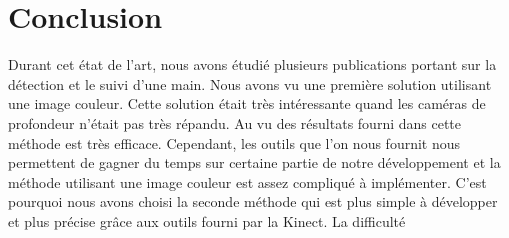 \chapter*{Conclusion}
Durant cet état de l'art, nous avons étudié plusieurs publications portant sur la détection et le suivi
d'une main. Nous avons vu une première solution utilisant une image couleur. Cette solution était très
intéressante quand les caméras de profondeur n'était pas très répandu. Au vu des résultats fourni dans
\cite{haarlike} cette méthode est très efficace. Cependant, les outils que l'on nous fournit nous permettent
de gagner du temps sur certaine partie de notre développement et la méthode utilisant une image couleur
est assez compliqué à implémenter. C'est pourquoi nous avons choisi la seconde méthode qui est plus
simple à développer et plus précise grâce aux outils fourni par la Kinect. La difficulté

